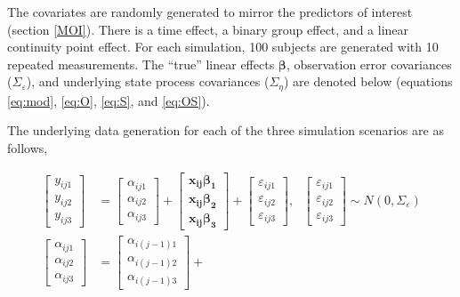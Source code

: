 \documentclass[
]{article}
\begin{document}
The covariates are randomly generated to mirror the predictors of interest (section \ref{MOI}). There is a time effect, a binary group effect, and a linear continuity point effect. For each simulation, 100 subjects are generated with 10 repeated measurements. The ``true'' linear effects \(\boldsymbol{\beta}\), observation error covariances (\(\Sigma_\varepsilon\)), and underlying state process covariances (\(\Sigma_\eta\)) are denoted below (equations \ref{eq:mod}, \ref{eq:O}, \ref{eq:S}, and \ref{eq:OS}).

The underlying data generation for each of the three simulation scenarios are as follows,

\begin{equation}\label{eq:mod}
\begin{aligned}
\begin{bmatrix}
y_{ij1}\\
y_{ij2}\\
y_{ij3}
\end{bmatrix}
&= \begin{bmatrix}
\alpha_{ij1}\\
\alpha_{ij2}\\
\alpha_{ij3}
\end{bmatrix}
+ 
\begin{bmatrix}
\boldsymbol{x_{ij}\beta_1}\\
\boldsymbol{x_{ij}\beta_2}\\
\boldsymbol{x_{ij}\beta_3} 
\end{bmatrix} +
\begin{bmatrix}
\varepsilon_{ij1}\\
\varepsilon_{ij2}\\
\varepsilon_{ij3}
\end{bmatrix}, \ \ \ 
\begin{bmatrix}
\varepsilon_{ij1}\\
\varepsilon_{ij2}\\
\varepsilon_{ij3}
\end{bmatrix} 
\sim N(0, \Sigma_\varepsilon
)\\
\begin{bmatrix}
\alpha_{ij1}\\
\alpha_{ij2}\\
\alpha_{ij3}
\end{bmatrix} & = 
\begin{bmatrix}
\alpha_{i(j-1)1}\\
\alpha_{i(j-1)2}\\
\alpha_{i(j-1)3}
\end{bmatrix} +

\end{aligned}
\end{equation}
\end{document}
